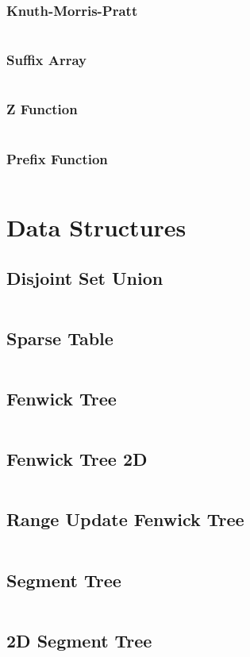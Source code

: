 \documentclass[a4paper, 10pt, twocolumn, landscape]{article}
\begin{document}
  \subsubsection{Knuth-Morris-Pratt}
  \inputminted{cpp}{strings/kmp.cpp}
  \subsubsection{Suffix Array}
  \inputminted{cpp}{strings/suffix-array.cpp}
  \subsubsection{Z Function}
  \inputminted{cpp}{strings/z.cpp}
  \subsubsection{Prefix Function}
  \inputminted{cpp}{strings/prefix.cpp}

 
  \section{Data Structures}
  \subsection{Disjoint Set Union}
  \inputminted{cpp}{data-structures/dsu.cpp}
  \subsection{Sparse Table}
  \inputminted{cpp}{data-structures/sparse.cpp}
  \subsection{Fenwick Tree}
  \inputminted{cpp}{data-structures/bit.cpp}
  \subsection{Fenwick Tree 2D}
  \inputminted{cpp}{data-structures/bit2d.cpp}
  \subsection{Range Update Fenwick Tree}
  \inputminted{cpp}{data-structures/bit-range.cpp}
  \subsection{Segment Tree}
  \inputminted{cpp}{data-structures/segtree.cpp}
  \subsection{2D Segment Tree}
  \inputminted{cpp}{data-structures/segtree-2d.cpp}
\end{document}
